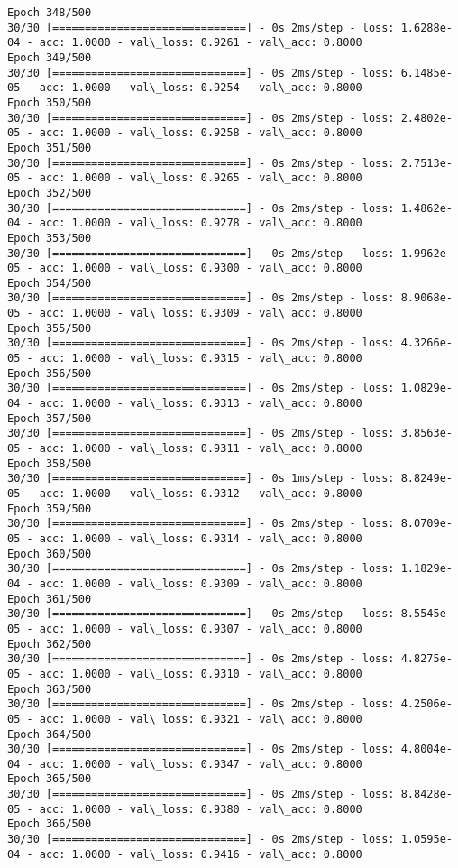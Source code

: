 \documentclass[11pt]{article}
\begin{document}
\begin{Verbatim}[commandchars=\\\{\}]
Epoch 348/500
30/30 [==============================] - 0s 2ms/step - loss: 1.6288e-04 - acc: 1.0000 - val\_loss: 0.9261 - val\_acc: 0.8000
Epoch 349/500
30/30 [==============================] - 0s 2ms/step - loss: 6.1485e-05 - acc: 1.0000 - val\_loss: 0.9254 - val\_acc: 0.8000
Epoch 350/500
30/30 [==============================] - 0s 2ms/step - loss: 2.4802e-05 - acc: 1.0000 - val\_loss: 0.9258 - val\_acc: 0.8000
Epoch 351/500
30/30 [==============================] - 0s 2ms/step - loss: 2.7513e-05 - acc: 1.0000 - val\_loss: 0.9265 - val\_acc: 0.8000
Epoch 352/500
30/30 [==============================] - 0s 2ms/step - loss: 1.4862e-04 - acc: 1.0000 - val\_loss: 0.9278 - val\_acc: 0.8000
Epoch 353/500
30/30 [==============================] - 0s 2ms/step - loss: 1.9962e-05 - acc: 1.0000 - val\_loss: 0.9300 - val\_acc: 0.8000
Epoch 354/500
30/30 [==============================] - 0s 2ms/step - loss: 8.9068e-05 - acc: 1.0000 - val\_loss: 0.9309 - val\_acc: 0.8000
Epoch 355/500
30/30 [==============================] - 0s 2ms/step - loss: 4.3266e-05 - acc: 1.0000 - val\_loss: 0.9315 - val\_acc: 0.8000
Epoch 356/500
30/30 [==============================] - 0s 2ms/step - loss: 1.0829e-04 - acc: 1.0000 - val\_loss: 0.9313 - val\_acc: 0.8000
Epoch 357/500
30/30 [==============================] - 0s 2ms/step - loss: 3.8563e-05 - acc: 1.0000 - val\_loss: 0.9311 - val\_acc: 0.8000
Epoch 358/500
30/30 [==============================] - 0s 1ms/step - loss: 8.8249e-05 - acc: 1.0000 - val\_loss: 0.9312 - val\_acc: 0.8000
Epoch 359/500
30/30 [==============================] - 0s 2ms/step - loss: 8.0709e-05 - acc: 1.0000 - val\_loss: 0.9314 - val\_acc: 0.8000
Epoch 360/500
30/30 [==============================] - 0s 2ms/step - loss: 1.1829e-04 - acc: 1.0000 - val\_loss: 0.9309 - val\_acc: 0.8000
Epoch 361/500
30/30 [==============================] - 0s 2ms/step - loss: 8.5545e-05 - acc: 1.0000 - val\_loss: 0.9307 - val\_acc: 0.8000
Epoch 362/500
30/30 [==============================] - 0s 2ms/step - loss: 4.8275e-05 - acc: 1.0000 - val\_loss: 0.9310 - val\_acc: 0.8000
Epoch 363/500
30/30 [==============================] - 0s 2ms/step - loss: 4.2506e-05 - acc: 1.0000 - val\_loss: 0.9321 - val\_acc: 0.8000
Epoch 364/500
30/30 [==============================] - 0s 2ms/step - loss: 4.8004e-04 - acc: 1.0000 - val\_loss: 0.9347 - val\_acc: 0.8000
Epoch 365/500
30/30 [==============================] - 0s 2ms/step - loss: 8.8428e-05 - acc: 1.0000 - val\_loss: 0.9380 - val\_acc: 0.8000
Epoch 366/500
30/30 [==============================] - 0s 2ms/step - loss: 1.0595e-04 - acc: 1.0000 - val\_loss: 0.9416 - val\_acc: 0.8000

\end{Verbatim}
\end{document}
